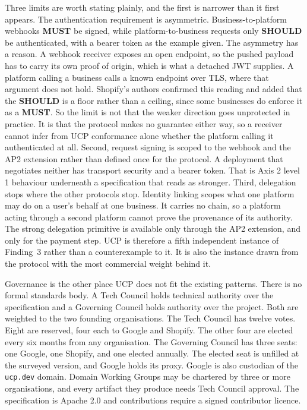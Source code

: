 Three limits are worth stating plainly, and the first is
narrower than it first appears. The authentication requirement
is asymmetric. Business-to-platform webhooks \textbf{MUST} be
signed, while platform-to-business requests only
\textbf{SHOULD} be authenticated, with a bearer token as the
example given. The asymmetry has a reason. A webhook receiver
exposes an open endpoint, so the pushed payload has to carry
its own proof of origin, which is what a detached JWT supplies.
A platform calling a business calls a known endpoint over TLS,
where that argument does not hold. Shopify's authors
confirmed this reading and added that the \textbf{SHOULD} is a floor
rather than a ceiling, since some businesses do enforce it as a
\textbf{MUST}. So the limit is not that the weaker direction
goes unprotected in practice. It is that the protocol makes no
guarantee either way, so a receiver cannot infer from UCP
conformance alone whether the platform calling it authenticated
at all. Second, request signing is scoped to the
webhook and the AP2 extension rather than defined once for the
protocol. A deployment that negotiates neither has
transport security and a bearer token. That is Axis 2 level 1
behaviour underneath a specification that reads as
stronger. Third, delegation stops where the other protocols
stop. Identity linking scopes what one platform may do on a
user's behalf at one business. It carries no chain, so a
platform acting through a second platform cannot prove the
provenance of its authority. The strong delegation primitive
is available only through the AP2 extension, and only for the
payment step. UCP is therefore a fifth independent instance
of Finding~3 rather than a counterexample to it. It is also
the instance drawn from the protocol with the most commercial
weight behind it.

Governance is the other place UCP does not fit the existing
patterns. There is no formal standards body. A Tech Council
holds technical authority over the specification and a
Governing Council holds authority over the project. Both are
weighted to the two founding organisations. The Tech Council
has twelve votes. Eight are reserved, four each to Google and
Shopify. The other four are elected every six months from any
organisation. The Governing Council has three seats: one
Google, one Shopify, and one elected annually. The elected
seat is unfilled at the surveyed version, and Google holds its
proxy. Google is also custodian of the \texttt{ucp.dev}
domain. Domain Working Groups may be chartered by three or
more organisations, and every artifact they produce needs Tech
Council approval. The specification is Apache 2.0 and
contributions require a signed contributor licence.


